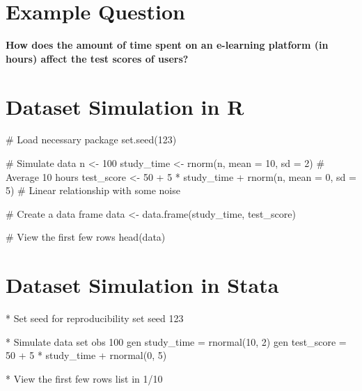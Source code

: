 \documentclass[
  letterpaper,
  DIV=11,
  numbers=noendperiod]{scrreprt}
\newenvironment{Shaded}{\begin{snugshade}}{\end{snugshade}}
\newcommand{\AttributeTok}[1]{\textcolor[rgb]{0.40,0.45,0.13}{#1}}
\newcommand{\BaseNTok}[1]{\textcolor[rgb]{0.68,0.00,0.00}{#1}}
\newcommand{\CommentTok}[1]{\textcolor[rgb]{0.37,0.37,0.37}{#1}}
\newcommand{\DecValTok}[1]{\textcolor[rgb]{0.68,0.00,0.00}{#1}}
\newcommand{\FunctionTok}[1]{\textcolor[rgb]{0.28,0.35,0.67}{#1}}
\newcommand{\KeywordTok}[1]{\textcolor[rgb]{0.00,0.23,0.31}{#1}}
\newcommand{\NormalTok}[1]{\textcolor[rgb]{0.00,0.23,0.31}{#1}}
\newcommand{\OtherTok}[1]{\textcolor[rgb]{0.00,0.23,0.31}{#1}}
\newcommand{\SpecialCharTok}[1]{\textcolor[rgb]{0.37,0.37,0.37}{#1}}
\begin{document}
\section{Example Question}\label{example-question-1}

\textbf{How does the amount of time spent on an e-learning platform (in
hours) affect the test scores of users?}

\section{Dataset Simulation in R}\label{dataset-simulation-in-r}

\begin{Shaded}
\begin{Highlighting}[]
\CommentTok{\# Load necessary package}
\FunctionTok{set.seed}\NormalTok{(}\DecValTok{123}\NormalTok{)}

\CommentTok{\# Simulate data}
\NormalTok{n }\OtherTok{\textless{}{-}} \DecValTok{100}
\NormalTok{study\_time }\OtherTok{\textless{}{-}} \FunctionTok{rnorm}\NormalTok{(n, }\AttributeTok{mean =} \DecValTok{10}\NormalTok{, }\AttributeTok{sd =} \DecValTok{2}\NormalTok{)  }\CommentTok{\# Average 10 hours}
\NormalTok{test\_score }\OtherTok{\textless{}{-}} \DecValTok{50} \SpecialCharTok{+} \DecValTok{5} \SpecialCharTok{*}\NormalTok{ study\_time }\SpecialCharTok{+} \FunctionTok{rnorm}\NormalTok{(n, }\AttributeTok{mean =} \DecValTok{0}\NormalTok{, }\AttributeTok{sd =} \DecValTok{5}\NormalTok{)  }\CommentTok{\# Linear relationship with some noise}

\CommentTok{\# Create a data frame}
\NormalTok{data }\OtherTok{\textless{}{-}} \FunctionTok{data.frame}\NormalTok{(study\_time, test\_score)}

\CommentTok{\# View the first few rows}
\FunctionTok{head}\NormalTok{(data)}
\end{Highlighting}
\end{Shaded}

\section{Dataset Simulation in Stata}\label{dataset-simulation-in-stata}

\begin{Shaded}
\begin{Highlighting}[]
\NormalTok{* Set }\DecValTok{seed} \KeywordTok{for}\NormalTok{ reproducibility}
\KeywordTok{set} \DecValTok{seed}\NormalTok{ 123}

\NormalTok{* Simulate }\KeywordTok{data}
\KeywordTok{set} \KeywordTok{obs}\NormalTok{ 100}
\KeywordTok{gen}\NormalTok{ study\_time = rnormal(10, 2)}
\KeywordTok{gen}\NormalTok{ test\_score = 50 + 5 * study\_time + rnormal(0, 5)}

\NormalTok{* View the first few }\BaseNTok{rows}
\OtherTok{list} \KeywordTok{in}\NormalTok{ 1/10}
\end{Highlighting}
\end{Shaded}
\end{document}
